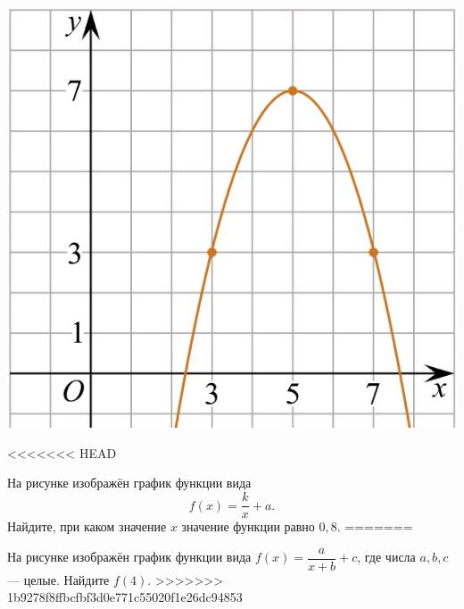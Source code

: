 \begin{class}[number=5]
\begin{listofex}
\begin{minipage}[t]{\bodywidth}
		\begin{minipage}[t]{\picwidth}
			\includegraphics[align=t, width=\textwidth]{../pics/G101M4H2-5.jpg}
		\end{minipage}
		\item
<<<<<<< HEAD
		\begin{minipage}[t]{\bodywidth}
			На рисунке изображён график функции вида \[ f(x)=\dfrac{k}{x}+a. \] Найдите, при каком значение \( x \) значение функции равно \(0,8\).
=======
		\begin{minipage}[t]{0.43\textwidth}
			На рисунке изображён график функции вида \(f(x)=\dfrac{a}{x+b}+c\), где числа \(a, b, c\) --- целые. Найдите \(f(4)\).
>>>>>>> 1b9278f8ffbcfbf3d0e771c55020f1e26dc94853
		\end{minipage}
		\hspace{0.05\linewidth}
		\begin{minipage}[t]{\picwidth}

\end{minipage}
\end{minipage}
\end{minipage}
\end{listofex}
\end{class}
